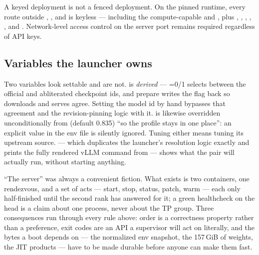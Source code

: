 \begin{hbnote}
A keyed deployment is not a fenced deployment. On the pinned runtime, every
route outside , , and  is keyless ---
including the compute-capable  and
, plus , ,
, , , and . Network-level
access control on the server port remains required regardless of API keys.
\end{hbnote}

\subsection{Variables the launcher owns}

Two variables look settable and are not.  is
\emph{derived} --- =0/1 selects between the official and
abliterated checkpoint ids, and prepare writes the flag back so downloads and
serves agree. Setting the model id by hand bypasses that agreement and the
revision-pinning logic with it.  is likewise
overridden unconditionally from 
(default 0.835) ``so the profile stays in one place'': an explicit value in
the env file is silently ignored. Tuning either means tuning its upstream
source.  --- which duplicates the
launcher's resolution logic exactly and prints the fully rendered vLLM command
from  --- shows what the pair
will actually run, without starting anything.

``The server'' was always a convenient fiction. What exists is two
containers, one rendezvous, and a set of acts --- start, stop, status,
patch, warm --- each only half-finished until the second rank has answered
for it; a green healthcheck on the head is a claim about one process, never
about the TP group. Three consequences run through every rule above: order
is a correctness property rather than a preference, exit codes are an API a
supervisor will act on literally, and the bytes a boot depends on --- the
normalized env snapshot, the 157\,GiB of weights, the JIT products --- have
to be made durable before anyone can make them fast.

\FloatBarrier
